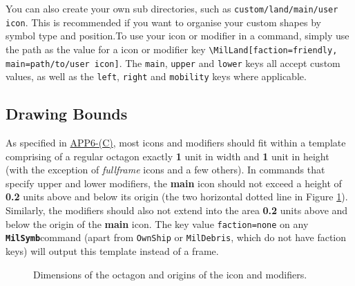 \documentclass[a4paper, titlepage]{article}
\newcommand\MilSymb{\textbf{\texttt{MilSymb}}}
\newcommand\DocLink{\href{https://www.awl.edu.pl/images/en/APP_6_C.pdf}{APP6-(C)}}
\begin{document}
You can also create your own sub directories, such as \texttt{custom/land/main/user icon}. This is recommended if you want to organise your custom shapes by symbol type and position.To use your icon or modifier in a command, simply use the path as the value for a icon or modifier key \texttt{\textbackslash MilLand[faction=friendly, main=path/to/user icon]}. The \texttt{main}, \texttt{upper} and \texttt{lower} keys all accept custom values, as well as the \texttt{left}, \texttt{right} and \texttt{mobility} keys where applicable.

\subsection{Drawing Bounds}

As specified in \DocLink, most icons and modifiers should fit within a template comprising of a regular octagon exactly \textbf{1} unit in width and \textbf{1} unit in height (with the exception of \textit{fullframe} icons and a few others). In commands that specify upper and lower modifiers, the \textbf{main} icon should not exceed a height of \textbf{0.2} units above and below its origin (the two horizontal dotted line in Figure \ref{octagon}). Similarly, the modifiers should also not extend into the area \textbf{0.2} units above and below the origin of the \textbf{main} icon. The key value \texttt{faction=none} on any \MilSymb command (apart from \texttt{OwnShip} or \texttt{MilDebris}, which do not have faction keys) will output this template instead of a frame.

\begin{figure}[H]
\centering
{}
\caption{Dimensions of the octagon and origins of the icon and modifiers.}
\label{octagon}
\end{figure}
\end{document}
